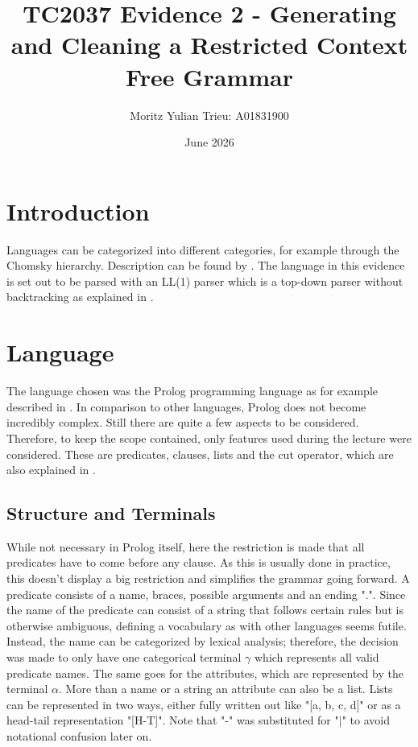 \documentclass{article}
\title{TC2037 Evidence 2 - Generating and Cleaning a Restricted Context Free Grammar}
\author{Moritz Yulian Trieu: A01831900}
\date{June 2026}
\begin{document}
\maketitle

\section{Introduction}
Languages can be categorized into different categories, for example through the Chomsky hierarchy. Description 
can be found by \cite{g4g-chomsky}. The language in this evidence is set out to be
parsed with an LL(1) parser which is a top-down parser without backtracking as explained in \cite{enwiki-ll}.

\section{Language}
The language chosen was the Prolog programming language as for example described in \cite{enwiki-prolog}. In comparison to other languages, Prolog does not become incredibly complex. Still there are quite a few aspects to be considered. Therefore, to keep the scope contained, only features used during the lecture were considered. These are predicates, clauses, lists and the cut operator, which are also explained in \cite{boklm-prolog}.

\subsection{Structure and Terminals}
While not necessary in Prolog itself, here the restriction is made that all predicates have to come before any clause. As this is usually done in practice, this doesn't display a big restriction and simplifies the grammar going forward. A predicate consists of a name, braces, possible arguments and an ending ".". Since the name of the predicate can consist of a string that follows certain rules but is otherwise ambiguous, defining a vocabulary as with other languages seems futile. Instead, the name can be categorized by lexical analysis; therefore, the decision was made to only have one categorical terminal $\gamma$ which represents all valid predicate names.  The same goes for the attributes, which are represented by the terminal $\alpha$. More than a name or a string an attribute can also be a list. Lists can be represented in two ways, either fully written out like "[a, b, c, d]" or as a head-tail representation "[H-T]". Note that "-" was substituted for "$|$" to avoid notational confusion later on. 
\end{document}
